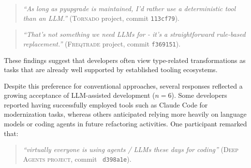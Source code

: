 \begin{quote}
\textit{``As long as pyupgrade is maintained, I'd rather use a deterministic tool than an LLM.''} (\textsc{Tornado} project, commit \texttt{113cf79}).
\end{quote}

\begin{quote}
\textit{``That's not something we need LLMs for - it's a straightforward rule-based replacement.''} (\textsc{Freqtrade} project, commit \texttt{f369151}).
\end{quote}

These findings suggest that developers often view type-related transformations as tasks that are already well supported by established tooling ecosystems.



Despite this preference for conventional approaches, several responses reflected a growing acceptance of LLM-assisted development ($n = 6$). Some developers reported having successfully employed tools such as Claude Code for modernization tasks, whereas others anticipated relying more heavily on language models or coding agents in future refactoring activities. One participant remarked that:

\begin{quote}
\textit{``virtually everyone is using agents / LLMs these days for coding''} (\textsc{Deep Agents project}, commit ~\texttt{d398a1e}).
\end{quote}

